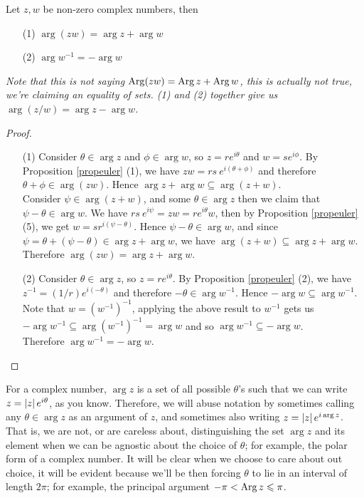 \begin{proposition}\label{prodarg}
Let $z,w$ be non-zero complex numbers, then
\begin{itemize}
\item[(1)] $\arg (zw) = \arg z + \arg w$
\item[(2)] $\arg w^{-1} = -\arg w$
\end{itemize}
\emph{Note that this is \emph{not} saying $\operatorname{Arg}(zw) = \operatorname{Arg} z + \operatorname{Arg} w$, this is actually not true, we're claiming an equality of sets. (1) and (2) together give us $\arg (z/w) = \arg z - \arg w$.}
\end{proposition}
\begin{proof}\hfill
\begin{itemize}
\item[(1)] Consider $\theta \in \arg z$ and $\phi \in \arg w$, so $z = re^{i\theta}$ and $w = se^{i\phi}$. By Proposition \ref{propeuler} (1), we have $zw = rs\ e^{i(\theta + \phi)}$ and therefore $\theta + \phi \in \arg(zw)$. Hence $\arg z + \arg w \subseteq \arg(z + w)$.\\[0.5em]
Consider $\psi \in \arg(z+w)$, and some $\theta \in \arg z$ then we claim that $\psi - \theta \in \arg w$. We have $rs\ e^{i\psi} = zw = re^{i\theta}w$, then by Proposition \ref{propeuler} (5), we get $w = sr^{i(\psi - \theta)}$. Hence $\psi - \theta \in \arg w$, and since $\psi = \theta + (\psi - \theta) \in \arg z + \arg w$, we have $\arg(z+w) \subseteq \arg z + \arg w$.\\[0.5em]
Therefore $\arg (zw) = \arg z + \arg w$.
\item[(2)] Consider $\theta \in \arg z$, so $z = re^{i\theta}$. By Proposition \ref{propeuler} (2), we have $z^{-1} = (1/r)e^{i(-\theta)}$ and therefore $-\theta \in \arg w^{-1}$. Hence $-\arg w \subseteq \arg w^{-1}$.\\[0.5em]
Note that $w = (w^{-1})^{-1}$, applying the above result to $w^{-1}$ gets us $-\arg w^{-1} \subseteq \arg (w^{-1})^{-1} = \arg w$ and so $\arg w^{-1} \subseteq - \arg w$.\\[0.5em]
Therefore $\arg w^{-1} = -\arg w$.
\end{itemize}
\vspace*{-\baselineskip}
\end{proof}

\medskip

\begin{remark}
For a complex number, $\arg z$ is a set of all possible $\theta$'s such that we can write $z = \left\lvert z\right\rvert e^{i\theta}$, as you know. Therefore, we will abuse notation by sometimes calling any $\theta \in \arg z$ as an argument of $z$, and sometimes also writing $z = \left\lvert z\right\rvert e^{i\arg z}$. That is, we are not, or are careless about, distinguishing the set $\arg z$ and its element when we can be agnostic about the choice of $\theta$; for example, the polar form of a complex number. It will be clear when we choose to care about out choice, it will be evident because we'll be then forcing $\theta$ to lie in an interval of length $2\pi$; for example, the principal argument $-\pi < \operatorname{Arg} z \leqslant \pi$.
\end{remark}


